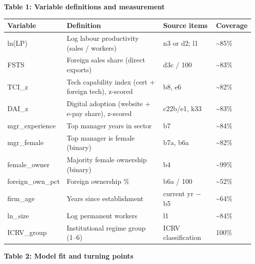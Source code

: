 \documentclass[12pt,a4paper]{article}
\begin{document}
\textbf{Table 1: Variable definitions and measurement}

\begin{longtable}[]{@{}llll@{}}
\toprule\noalign{}
Variable & Definition & Source items & Coverage \\
\midrule\noalign{}
\endhead
\bottomrule\noalign{}
\endlastfoot
ln(LP) & Log labour productivity (sales / workers) & n3 or d2; l1 &
\textasciitilde85\% \\
FSTS & Foreign sales share (direct exports) & d3c / 100 &
\textasciitilde83\% \\
TCI\_z & Tech capability index (cert + foreign tech), z-scored & b8, e6
& \textasciitilde82\% \\
DAI\_z & Digital adoption (website + e-pay share), z-scored & c22b/e1,
k33 & \textasciitilde83\% \\
mgr\_experience & Top manager years in sector & b7 &
\textasciitilde84\% \\
mgr\_female & Top manager is female (binary) & b7a, b6a &
\textasciitilde82\% \\
female\_owner & Majority female ownership (binary) & b4 &
\textasciitilde99\% \\
foreign\_own\_pct & Foreign ownership \% & b6a / 100 &
\textasciitilde52\% \\
firm\_age & Years since establishment & current yr − b5 &
\textasciitilde64\% \\
ln\_size & Log permanent workers & l1 & \textasciitilde84\% \\
ICRV\_group & Institutional regime group (1--6) & ICRV classification &
100\% \\
\end{longtable}

\textbf{Table 2: Model fit and turning points}
\end{document}
